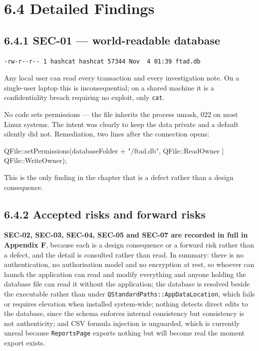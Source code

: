 \documentclass[
  12pt,
]{report}
\newenvironment{Shaded}{}{}
\newcommand{\ExtensionTok}[1]{#1}
\newcommand{\NormalTok}[1]{#1}
\newcommand{\OperatorTok}[1]{\textcolor[rgb]{0.40,0.40,0.40}{#1}}
\newcommand{\StringTok}[1]{\textcolor[rgb]{0.25,0.44,0.63}{#1}}
\begin{document}
\section{6.4 Detailed Findings}\label{detailed-findings}

\subsection{6.4.1 SEC-01 --- world-readable
database}\label{sec-01-world-readable-database}

\begin{verbatim}
-rw-r--r-- 1 hashcat hashcat 57344 Nov  4 01:39 ftad.db
\end{verbatim}

Any local user can read every transaction and every investigation note.
On a single-user laptop this is inconsequential; on a shared machine it
is a confidentiality breach requiring no exploit, only \texttt{cat}.

No code sets permissions --- the file inherits the process umask, 022 on
most Linux systems. The intent was clearly to keep the data private and
a default silently did not. Remediation, two lines after the connection
opens:

\begin{Shaded}
\begin{Highlighting}[]
\ExtensionTok{QFile::setPermissions}\OperatorTok{(}\NormalTok{databaseFolder }\OperatorTok{+} \StringTok{"/ftad.db"}\OperatorTok{,}
    \ExtensionTok{QFile::ReadOwner} \OperatorTok{|} \ExtensionTok{QFile::WriteOwner}\OperatorTok{);}
\end{Highlighting}
\end{Shaded}

This is the only finding in the chapter that is a defect rather than a
design consequence.

\subsection{6.4.2 Accepted risks and forward
risks}\label{accepted-risks-and-forward-risks}

\textbf{SEC-02, SEC-03, SEC-04, SEC-05 and SEC-07 are recorded in full
in Appendix F}, because each is a design consequence or a forward risk
rather than a defect, and the detail is consulted rather than read. In
summary: there is no authentication, no authorisation model and no
encryption at rest, so whoever can launch the application can read and
modify everything and anyone holding the database file can read it
without the application; the database is resolved beside the executable
rather than under \texttt{QStandardPaths::AppDataLocation}, which fails
or requires elevation when installed system-wide; nothing detects direct
edits to the database, since the schema enforces internal consistency
but consistency is not authenticity; and CSV formula injection is
unguarded, which is currently unreal because \texttt{ReportsPage}
exports nothing but will become real the moment export exists.
\end{document}
